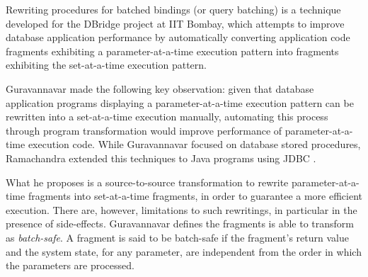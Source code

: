 Rewriting procedures for batched bindings (or query batching) is a technique developed for the DBridge project  \cite{karthik-ramachandra:2015aa,mahendra-chavan:2011aa,karthik-ramachandra:2011aa,ravindra-guravannavar:2008aa} at IIT Bombay, which attempts to improve database application performance by automatically converting application code fragments exhibiting a parameter-at-a-time execution pattern into fragments exhibiting the set-at-a-time execution pattern.

Guravannavar \cite{ravindra-guravannavar:2008aa} made the following key observation: given that database application programs displaying a parameter-at-a-time execution pattern can be rewritten into a set-at-a-time execution manually, automating this process through program transformation would improve performance of parameter-at-a-time execution code. While Guravannavar focused on database stored procedures, Ramachandra \cite{karthik-ramachandra:2011aa} extended this techniques to Java programs using JDBC \cite{jdbc}.

What he proposes is a source-to-source transformation to rewrite parameter-at-a-time fragments into set-at-a-time fragments, in order to guarantee a more efficient execution. There are, however, limitations to such rewritings, in particular in the presence of side-effects. Guravannavar defines the fragments is able to transform as \emph{batch-safe}. A fragment is said to be batch-safe if the fragment's return value and the system state, for any parameter, are independent from the order in which the parameters are processed.

